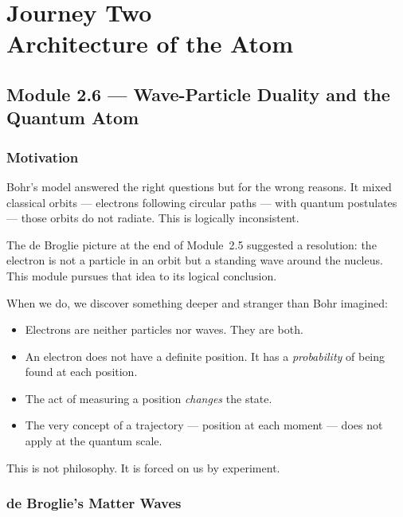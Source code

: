 \documentclass[12pt, a4paper]{book}
\begin{document}
\setcounter{chapter}{1}
\chapter[Journey 2 --- Architecture of the Atom]
        {Journey Two\\[8pt]
         \textcolor{ModuleColor}{\large Architecture of the Atom}}
\setcounter{section}{5}

\section{Module 2.6 --- Wave-Particle Duality and the Quantum Atom}
\label{sec:mod2.6}

\subsection*{Motivation}

Bohr's model answered the right questions but for the wrong reasons.
It mixed classical orbits --- electrons following circular paths ---
with quantum postulates --- those orbits do not radiate.
This is logically inconsistent.

The de Broglie picture at the end of Module~2.5 suggested
a resolution: the electron is not a particle in an orbit
but a standing wave around the nucleus.
This module pursues that idea to its logical conclusion.

When we do, we discover something deeper and stranger
than Bohr imagined:
\begin{itemize}[nosep, leftmargin=2em]
  \item Electrons are neither particles nor waves. They are both.
  \item An electron does not have a definite position.
        It has a \emph{probability} of being found at each position.
  \item The act of measuring a position \emph{changes} the state.
  \item The very concept of a trajectory --- position at each moment ---
        does not apply at the quantum scale.
\end{itemize}

This is not philosophy. It is forced on us by experiment.

\subsection{de Broglie's Matter Waves}
\end{document}
